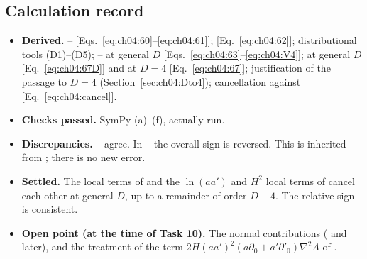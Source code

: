 \subsection{Calculation record}
\begin{itemize}[leftmargin=1.2em,itemsep=2pt]
\item \textbf{Derived.} -- [Eqs.~\eqref{eq:ch04:60}--\eqref{eq:ch04:61}];  [Eq.~\eqref{eq:ch04:62}];
distributional tools (D1)--(D5); -- at general $D$ [Eqs.~\eqref{eq:ch04:63}--\eqref{eq:ch04:V4}];
 at general $D$ [Eq.~\eqref{eq:ch04:67D}] and at $D=4$ [Eq.~\eqref{eq:ch04:67}];
justification of the passage to $D=4$ (Section~\ref{sec:ch04:Dto4});
cancellation against  [Eq.~\eqref{eq:ch04:cancel}].
\item \textbf{Checks passed.} SymPy (a)--(f), actually run.
\item \textbf{Discrepancies.} -- agree.
In -- the overall sign is reversed. This is inherited from ; there is no new error.
\item \textbf{Settled.} The local terms of  and the $\ln(aa')$ and $H^2$ local terms of  cancel each other at general $D$, up to a remainder of order $D-4$.
The relative sign is consistent.
\item \textbf{Open point (at the time of Task 10).} The normal contributions ( and later), and the treatment of the term $2H(aa')^2(a\partial_0+a'\partial'_0)\nabla^2A$ of .
\end{itemize}
